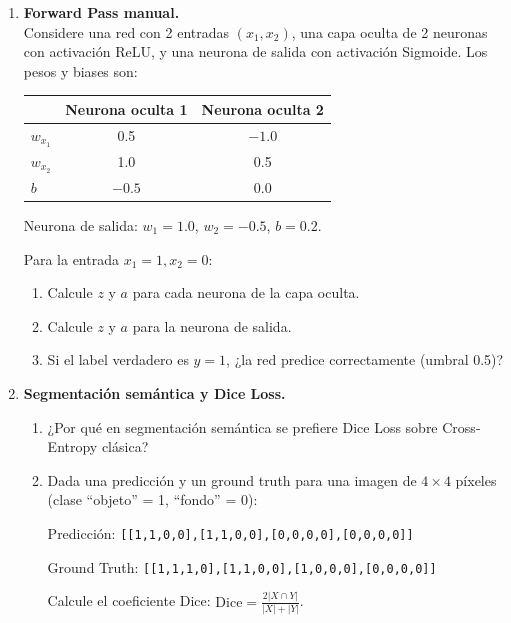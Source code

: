 \documentclass[12pt,a4paper]{article}
\begin{document}
\begin{enumerate}[label=\arabic*)]
    \item \textbf{Forward Pass manual.} \\
    Considere una red con 2 entradas $(x_1, x_2)$, una capa oculta de 2 neuronas con activación ReLU, y una neurona de salida con activación Sigmoide. Los pesos y biases son:

    \begin{center}
    \begin{tabular}{lcc}
    \toprule
    & Neurona oculta 1 & Neurona oculta 2 \\
    \midrule
    $w_{x_1}$ & 0.5 & $-1.0$ \\
    $w_{x_2}$ & 1.0 & 0.5 \\
    $b$ & $-0.5$ & 0.0 \\
    \bottomrule
    \end{tabular}
    \end{center}

    Neurona de salida: $w_1 = 1.0$, $w_2 = -0.5$, $b = 0.2$.

    Para la entrada $x_1 = 1, x_2 = 0$:
    \begin{enumerate}[label=\alph*)]
        \item Calcule $z$ y $a$ para cada neurona de la capa oculta.
        \item Calcule $z$ y $a$ para la neurona de salida.
        \item Si el label verdadero es $y = 1$, ¿la red predice correctamente (umbral 0.5)?
    \end{enumerate}

    \item \textbf{Segmentación semántica y Dice Loss.} \\
    \begin{enumerate}[label=\alph*)]
        \item ¿Por qué en segmentación semántica se prefiere Dice Loss sobre Cross-Entropy clásica?
        \item Dada una predicción y un ground truth para una imagen de $4 \times 4$ píxeles (clase ``objeto'' = 1, ``fondo'' = 0):

        Predicción: \texttt{[[1,1,0,0],[1,1,0,0],[0,0,0,0],[0,0,0,0]]}

        Ground Truth: \texttt{[[1,1,1,0],[1,1,0,0],[1,0,0,0],[0,0,0,0]]}

        Calcule el coeficiente Dice: $\text{Dice} = \frac{2|X \cap Y|}{|X| + |Y|}$.
    \end{enumerate}


\end{enumerate}
\end{document}
